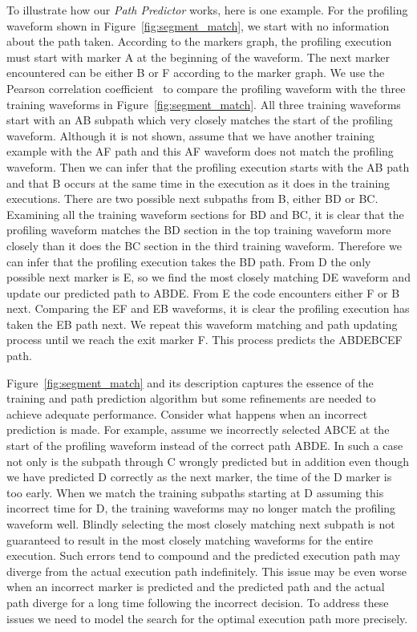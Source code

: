 To illustrate how our \textit{Path Predictor} works, here is one example. For the profiling waveform shown in Figure~\ref{fig:segment_match}, we start with no information about the path taken. According to the markers graph, the profiling execution must start with marker A at the beginning of the waveform. The next marker encountered can be either B or F according to the marker graph. We use the Pearson correlation coefficient~\cite{wherry1984} to compare the profiling waveform with the three training waveforms in Figure~\ref{fig:segment_match}. All three training waveforms start with an AB subpath which very closely matches the start of the profiling waveform. Although it is not shown, assume that we have another training example with the AF path and this AF waveform does not match the profiling waveform. Then we can infer that the profiling execution starts with the AB path and that B occurs at the same time in the execution as it does in the training executions. There are two possible next subpaths from B, either BD or BC. Examining all the training waveform sections for BD and BC, it is clear that the profiling waveform matches the BD section in the top training waveform more closely than it does the BC section in the third training waveform. Therefore we can infer that the profiling execution takes the BD path. From D the only possible next marker is E, so we find the most closely matching DE waveform and update our predicted path to ABDE. From E the code encounters either F or B next. Comparing the EF and EB waveforms, it is clear the profiling execution has taken the EB path next. We repeat this waveform matching and path updating process until we reach the exit marker F. This process predicts the ABDEBCEF path.

Figure~\ref{fig:segment_match} and its description captures the essence of the training and path prediction algorithm but some refinements are needed to achieve adequate performance. Consider what happens when an incorrect prediction is made. For example, assume we incorrectly selected ABCE at the start of the profiling waveform instead of the correct path ABDE. In such a case not only is the subpath through C wrongly predicted but in addition even though we have predicted D correctly as the next marker, the time of the D marker is too early. When we match the training subpaths starting at D assuming this incorrect time for D, the training waveforms may no longer match the profiling waveform well. Blindly selecting the most closely matching next subpath is not guaranteed to result in the most closely matching waveforms for the entire execution. Such errors tend to compound and the predicted execution path may diverge from the actual execution path indefinitely. This issue may be even worse when an incorrect marker is predicted and the predicted path and the actual path diverge for a long time following the incorrect decision. To address these issues we need to model the search for the optimal execution path more precisely.

